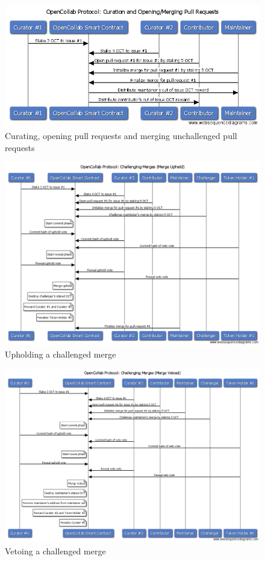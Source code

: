 \begin{figure}[p!]
  \centering
  \includegraphics[width=\linewidth,keepaspectratio]{figures/OpenCollab-Protocol-Curation-And-Opening-Merging-Pull-Requests.png}
  \caption{Curating, opening pull requests and merging unchallenged pull requests}
\end{figure}

\begin{figure}[p!]
  \centering
  \includegraphics[width=\linewidth,keepaspectratio]{figures/OpenCollab-Protocol-Challenging-Merges-Upheld.png}
  \caption{Upholding a challenged merge}
\end{figure}

\begin{figure}[p!]
  \centering
  \includegraphics[width=\linewidth,keepaspectratio]{figures/OpenCollab-Protocol-Challenging-Merges-Veto.png}
  \caption{Vetoing a challenged merge}
\end{figure}

